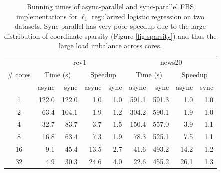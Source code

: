 \begin{table}[htbp]
\centering
 \begin{tabular}{|c|r|r|r|r|r|r|r|r|}
  \hline
  \multirow{3}{*}{\# cores} & \multicolumn{4}{|c|}{rcv1} & \multicolumn{4}{c|}{news20} \\
  \cline{2-9}
  & \multicolumn{2}{|c|}{Time (s)} &  \multicolumn{2}{c|}{Speedup} &  \multicolumn{2}{c|}{Time (s)} & \multicolumn{2}{c|}{Speedup}\\
  \cline{2-9}
  & async & sync &  async & sync &  async & sync &  async & sync \\
  \hline
   1 &   122.0 &  122.0 & 1.0   & 1.0 & 591.1   & 591.3 & 1.0   & 1.0\\
   2 &   63.4   &  104.1 & 1.9   & 1.2 & 304.2   & 590.1 & 1.9   & 1.0\\
   4 &   32.7   &  83.7   & 3.7   & 1.5 & 150.4   & 557.0 & 3.9   & 1.1\\
   8 &   16.8   &  63.4   & 7.3   & 1.9 & 78.3     & 525.1 & 7.5   & 1.1\\
   16 & 9.1     &  45.4   & 13.5 & 2.7 & 41.6     & 493.2 & 14.2 & 1.2\\
   32 & 4.9     &  30.3   & 24.6 & 4.0 & 22.6     & 455.2 & 26.1 & 1.3\\
  \hline
 \end{tabular}
 \caption{\label{tab:log_time}Running times of async-parallel and sync-parallel FBS implementations for $\ell_1$ regularized logistic regression on two datasets. Sync-parallel has very poor speedup  due to the large distribution of coordinate sparsity (Figure \ref{fig:sparsity}) and thus the large load imbalance across cores.}
\end{table}
